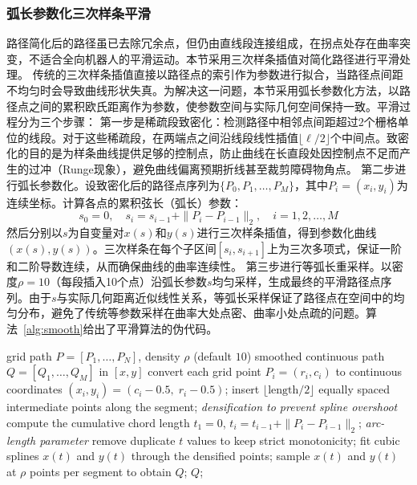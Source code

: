 \documentclass[lettersize,journal]{IEEEtran}
\begin{document}
\subsubsection{弧长参数化三次样条平滑}
路径简化后的路径虽已去除冗余点，但仍由直线段连接组成，在拐点处存在曲率突变，不适合全向机器人的平滑运动。本节采用三次样条插值对简化路径进行平滑处理。
传统的三次样条插值直接以路径点的索引作为参数进行拟合，当路径点间距不均匀时会导致曲线形状失真。为解决这一问题，本节采用弧长参数化方法，以路径点之间的累积欧氏距离作为参数，使参数空间与实际几何空间保持一致。平滑过程分为三个步骤：
第一步是稀疏段致密化：检测路径中相邻点间距超过2个栅格单位的线段。对于这些稀疏段，在两端点之间沿线段线性插值$\lfloor \ell / 2 \rfloor$个中间点。致密化的目的是为样条曲线提供足够的控制点，防止曲线在长直段处因控制点不足而产生的过冲（Runge现象），避免曲线偏离预期折线甚至裁剪障碍物角点。
第二步进行弧长参数化。设致密化后的路径点序列为$\{P_0, P_1, \ldots, P_M\}$，其中$P_i = (x_i, y_i)$为连续坐标。计算各点的累积弦长（弧长）参数：
\begin{equation}
s_0 = 0, \quad s_i = s_{i-1} + \|P_i - P_{i-1}\|_2, \quad i = 1, 2, \ldots, M
\label{eq:arclen}
\end{equation}
然后分别以$s$为自变量对$x(s)$和$y(s)$进行三次样条插值，得到参数化曲线$(x(s), y(s))$。三次样条在每个子区间$[s_i, s_{i+1}]$上为三次多项式，保证一阶和二阶导数连续，从而确保曲线的曲率连续性。
第三步进行等弧长重采样。以密度$\rho = 10$（每段插入10个点）沿弧长参数$s$均匀采样，生成最终的平滑路径点序列。由于$s$与实际几何距离近似线性关系，等弧长采样保证了路径点在空间中的均匀分布，避免了传统等参数采样在曲率大处点密、曲率小处点疏的问题。算法~\ref{alg:smooth}给出了平滑算法的伪代码。
\begin{algorithm}[!t]
\caption{Arc-length parameterized cubic spline smoothing}
\label{alg:smooth}
\begin{algorithmic}[1]
\REQUIRE grid path $P = [P_1, \ldots, P_N]$, density $\rho$ (default $10$)
\ENSURE smoothed continuous path $Q = [Q_1, \ldots, Q_M]$ in $[x, y]$
\STATE convert each grid point $P_i = (r_i, c_i)$ to continuous coordinates $(x_i, y_i) = (c_i - 0.5,\; r_i - 0.5)$;
\STATE insert $\lfloor \mathrm{length} / 2 \rfloor$ equally spaced intermediate points along the segment; \quad\textit{densification to prevent spline overshoot}
\ENDFOR
\STATE compute the cumulative chord length $t_1 = 0$, $t_i = t_{i-1} + \|P_i - P_{i-1}\|_2$; \quad\textit{arc-length parameter}
\STATE remove duplicate $t$ values to keep strict monotonicity;
\STATE fit cubic splines $x(t)$ and $y(t)$ through the densified points;
\STATE sample $x(t)$ and $y(t)$ at $\rho$ points per segment to obtain $Q$;
\STATE \RETURN $Q$;
\end{algorithmic}
\end{algorithm}
\end{document}
